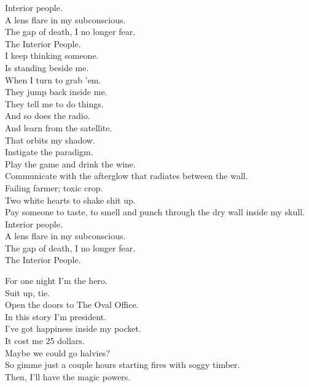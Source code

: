 Interior people. \\
A lens flare in my subconscious. \\
The gap of death, I no longer fear. \\
The Interior People. \\

I keep thinking someone. \\
Is standing beside me. \\
When I turn to grab 'em. \\
They jump back inside me. \\
They tell me to do things. \\
And so does the radio. \\
And learn from the satellite. \\
That orbits my shadow. \\

Instigate the paradigm. \\
Play the game and drink the wine. \\
Communicate with the afterglow that radiates between the wall. \\

Failing farmer; toxic crop. \\
Two white hearts to shake shit up. \\
Pay someone to taste, to smell and punch through the dry wall inside my skull. \\

Interior people. \\
A lens flare in my subconscious. \\
The gap of death, I no longer fear. \\
The Interior People. \\




For one night I'm the hero. \\
Suit up, tie. \\
Open the doors to The Oval Office. \\
In this story I'm president. \\

I've got happiness inside my pocket. \\
It cost me 25 dollars. \\
Maybe we could go halvies? \\
So gimme just a couple hours starting fires with soggy timber. \\
Then, I'll have the magic powers. \\

